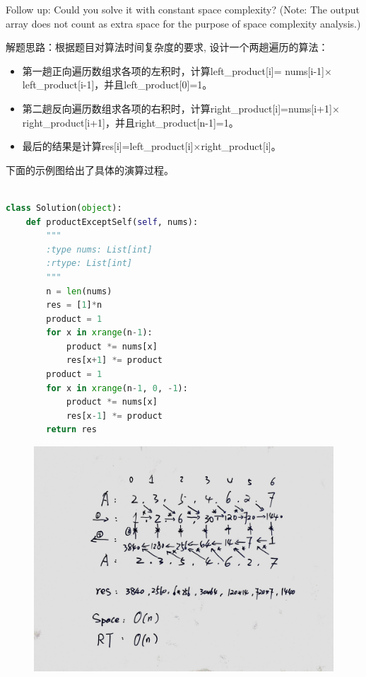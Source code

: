 \documentclass[a4paper,10pt]{article}
\begin{document}
\noindent Follow up: Could you solve it with constant space complexity? (Note: The output array does not count as extra space for the purpose of space complexity analysis.) \\

\begin{CJK*}{UTF8}{gbsn}
\noindent 解题思路：根据题目对算法时间复杂度的要求, 设计一个两趟遍历的算法：
\begin{itemize}
    \item 第一趟正向遍历数组求各项的左积时，计算left_product[i]= nums[i-1]$\times$left_product[i-1]，并且left_product[0]=1。
    \item 第二趟反向遍历数组求各项的右积时，计算right_product[i]=nums[i+1]$\times$right_product[i+1]，并且right_product[n-1]=1。
    \item 最后的结果是计算res[i]=left_product[i]$\times$right_product[i]。
\end{itemize}
下面的示例图给出了具体的演算过程。\\
\end{CJK*}

\begin{lstlisting}[language=Python, caption=Problem238. Product of Array Except Self]

class Solution(object):
    def productExceptSelf(self, nums):
        """
        :type nums: List[int]
        :rtype: List[int]
        """
        n = len(nums)
        res = [1]*n
        product = 1
        for x in xrange(n-1):
            product *= nums[x]
            res[x+1] *= product
        product = 1
        for x in xrange(n-1, 0, -1):
            product *= nums[x]
            res[x-1] *= product
        return res
\end{lstlisting}

\begin{figure}[h]
    \includegraphics[width=\textwidth]{leetcode238.jpg}
    \centering \\
\end{figure}
\end{document}
